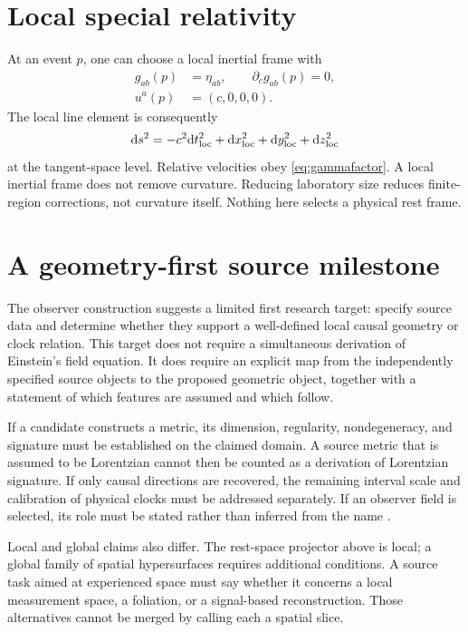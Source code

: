 \documentclass[11pt]{article}
\begin{document}
\section{Local special relativity}
At an event $p$, one can choose a local inertial frame with
\begin{align}
g_{ab}(p)&=\eta_{ab},\qquad \partial_cg_{ab}(p)=0,\label{eq:localinertial}\\
u^a(p)&=(c,0,0,0).\label{eq:localobserver}
\end{align}
The local line element is consequently
\begin{equation}
\mathrm d s^2=-c^2\mathrm d t_{\rm loc}^2+\mathrm d x_{\rm loc}^2+
\mathrm d y_{\rm loc}^2+\mathrm d z_{\rm loc}^2
\label{eq:localsr}
\end{equation}
at the tangent-space level. Relative velocities obey \eqref{eq:gammafactor}. A local inertial frame does not remove curvature. Reducing laboratory size reduces finite-region corrections, not curvature itself. Nothing here selects a physical \Aether{} rest frame.

\section{A geometry-first source milestone}
The observer construction suggests a limited first research target: specify source data and determine whether they support a well-defined local causal geometry or clock relation. This target does not require a simultaneous derivation of Einstein's field equation. It does require an explicit map from the independently specified source objects to the proposed geometric object, together with a statement of which features are assumed and which follow.

If a candidate constructs a metric, its dimension, regularity, nondegeneracy, and signature must be established on the claimed domain. A source metric that is assumed to be Lorentzian cannot then be counted as a derivation of Lorentzian signature. If only causal directions are recovered, the remaining interval scale and calibration of physical clocks must be addressed separately. If an observer field is selected, its role must be stated rather than inferred from the name \Aflow{}.

Local and global claims also differ. The rest-space projector above is local; a global family of spatial hypersurfaces requires additional conditions. A source task aimed at experienced space must say whether it concerns a local measurement space, a foliation, or a signal-based reconstruction. Those alternatives cannot be merged by calling each a spatial slice.
\end{document}

